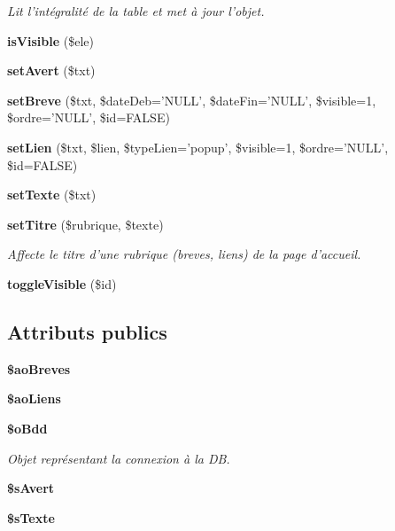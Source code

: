 \begin{CompactItemize}
\begin{CompactList}\small\item\em Lit l'intégralité de la table et met à jour l'objet. \item\end{CompactList}\item 
\textbf{isVisible} (\$ele)\label{class_c_accueil_a9f926e3b523c975a7ae7e576f526b0e}

\item 
\textbf{setAvert} (\$txt)\label{class_c_accueil_2cd4e911c96661688f94886c09e43e45}

\item 
\textbf{setBreve} (\$txt, \$dateDeb='NULL', \$dateFin='NULL', \$visible=1, \$ordre='NULL', \$id=FALSE)\label{class_c_accueil_f7a8581a2f5d6732950ffb7771ff2d07}

\item 
\textbf{setLien} (\$txt, \$lien, \$typeLien='popup', \$visible=1, \$ordre='NULL', \$id=FALSE)\label{class_c_accueil_fd8de3f70ea1c7874ca095afa6753504}

\item 
\textbf{setTexte} (\$txt)\label{class_c_accueil_2110d9f2ab558d5742ce24a6cc17dec4}

\item 
{\bf setTitre} (\$rubrique, \$texte)
\begin{CompactList}\small\item\em Affecte le titre d'une rubrique (breves, liens) de la page d'accueil. \item\end{CompactList}\item 
\textbf{toggleVisible} (\$id)\label{class_c_accueil_e7c651a2bc5b5db4c228f94064fe730d}

\end{CompactItemize}
\subsection*{Attributs publics}
\begin{CompactItemize}
\item 
\textbf{\$aoBreves}\label{class_c_accueil_244fa4e3be48aa35f5588a4e41da07cd}

\item 
\textbf{\$aoLiens}\label{class_c_accueil_28ed219744b732eb63be5f45d53453b3}

\item 
{\bf \$oBdd}\label{class_c_accueil_40a0493cd8c601604d1fd94c4816fe80}

\begin{CompactList}\small\item\em Objet représentant la connexion à la DB. \item\end{CompactList}\item 
\textbf{\$sAvert}\label{class_c_accueil_bad010470685b00e5c23198ac0b06709}

\item 
\textbf{\$sTexte}\label{class_c_accueil_93df22a3b98ee1ea1629fbd904bdce8e}

\end{CompactItemize}



